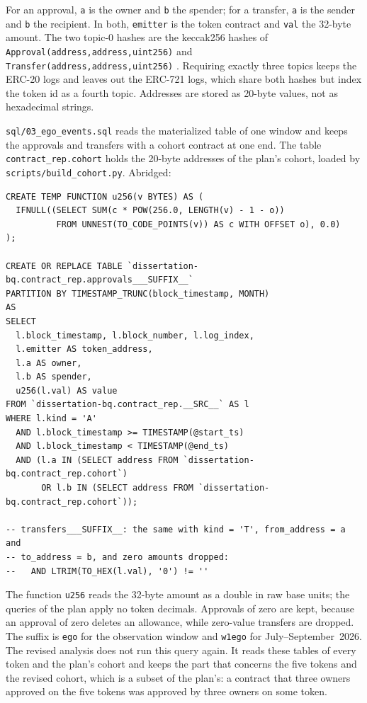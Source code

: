 For an approval, \texttt{a} is the owner and \texttt{b} the spender; for a transfer, \texttt{a} is the sender and \texttt{b} the recipient. In both, \texttt{emitter} is the token contract and \texttt{val} the 32-byte amount. The two topic-0 hashes are the keccak256 hashes of \texttt{Approval(address,address,uint256)} and \texttt{Transfer(address,address,uint256)} \parencite{vogelsteller2015erc20}. Requiring exactly three topics keeps the ERC-20 logs and leaves out the ERC-721 logs, which share both hashes but index the token id as a fourth topic. Addresses are stored as 20-byte values, not as hexadecimal strings.


\texttt{sql/03\_ego\_events.sql} reads the materialized table of one window and keeps the approvals and transfers with a cohort contract at one end. The table \texttt{contract\_rep.cohort} holds the 20-byte addresses of the plan's cohort, loaded by \texttt{scripts/build\_cohort.py}. Abridged:

\begin{verbatim}
CREATE TEMP FUNCTION u256(v BYTES) AS (
  IFNULL((SELECT SUM(c * POW(256.0, LENGTH(v) - 1 - o))
          FROM UNNEST(TO_CODE_POINTS(v)) AS c WITH OFFSET o), 0.0)
);

CREATE OR REPLACE TABLE `dissertation-bq.contract_rep.approvals___SUFFIX__`
PARTITION BY TIMESTAMP_TRUNC(block_timestamp, MONTH)
AS
SELECT
  l.block_timestamp, l.block_number, l.log_index,
  l.emitter AS token_address,
  l.a AS owner,
  l.b AS spender,
  u256(l.val) AS value
FROM `dissertation-bq.contract_rep.__SRC__` AS l
WHERE l.kind = 'A'
  AND l.block_timestamp >= TIMESTAMP(@start_ts)
  AND l.block_timestamp < TIMESTAMP(@end_ts)
  AND (l.a IN (SELECT address FROM `dissertation-bq.contract_rep.cohort`)
       OR l.b IN (SELECT address FROM `dissertation-bq.contract_rep.cohort`));

-- transfers___SUFFIX__: the same with kind = 'T', from_address = a and
-- to_address = b, and zero amounts dropped:
--   AND LTRIM(TO_HEX(l.val), '0') != ''
\end{verbatim}

The function \texttt{u256} reads the 32-byte amount as a double in raw base units; the queries of the plan apply no token decimals. Approvals of zero are kept, because an approval of zero deletes an allowance, while zero-value transfers are dropped. The suffix is \texttt{ego} for the observation window and \texttt{w1ego} for July--September~2026. The revised analysis does not run this query again. It reads these tables of every token and the plan's cohort and keeps the part that concerns the five tokens and the revised cohort, which is a subset of the plan's: a contract that three owners approved on the five tokens was approved by three owners on some token.

